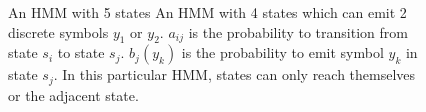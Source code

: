 \documentclass[a4paper,10pt]{article}
\begin{document}
\begin{figure}[htbp]
\begin{center}
  \end{center}
  \caption{An HMM with 5 states An HMM with 4 states which can emit 2 discrete symbols $y_1$ or $y_2$.
    $a_{ij}$ is the probability to transition from state $s_i$ to state $s_j$.
    $b_j(y_k)$ is the probability to emit symbol $y_k$ in state $s_j$.
    In this particular HMM, states can only reach themselves or the adjacent state.}
\end{figure}
\end{document}

